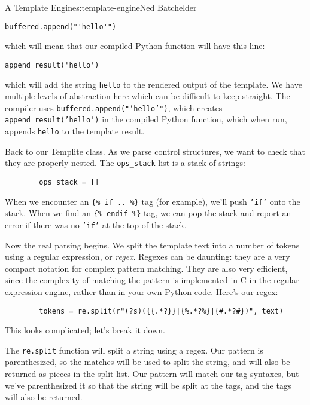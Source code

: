 \begin{aosachapter}{A Template Engine}{s:template-engine}{Ned Batchelder}
\begin{verbatim}
buffered.append("'hello'")
\end{verbatim}

which will mean that our compiled Python function will have this line:

\begin{verbatim}
append_result('hello')
\end{verbatim}

which will add the string \texttt{hello} to the rendered output of the
template. We have multiple levels of abstraction here which can be
difficult to keep straight. The compiler uses
\texttt{buffered.append("'hello'")}, which creates
\texttt{append\_result('hello')} in the compiled Python function, which
when run, appends \texttt{hello} to the template result.

Back to our Templite class. As we parse control structures, we want to
check that they are properly nested. The \texttt{ops\_stack} list is a
stack of strings:

\begin{verbatim}
        ops_stack = []
\end{verbatim}

When we encounter an \texttt{\{\% if .. \%\}} tag (for example), we'll
push \texttt{'if'} onto the stack. When we find an
\texttt{\{\% endif \%\}} tag, we can pop the stack and report an error
if there was no \texttt{'if'} at the top of the stack.

Now the real parsing begins. We split the template text into a number of
tokens using a regular expression, or \emph{regex}. Regexes can be
daunting: they are a very compact notation for complex pattern matching.
They are also very efficient, since the complexity of matching the
pattern is implemented in C in the regular expression engine, rather
than in your own Python code. Here's our regex:

\begin{verbatim}
        tokens = re.split(r"(?s)({{.*?}}|{%.*?%}|{#.*?#})", text)
\end{verbatim}

This looks complicated; let's break it down.

The \texttt{re.split} function will split a string using a regex. Our
pattern is parenthesized, so the matches will be used to split the
string, and will also be returned as pieces in the split list. Our
pattern will match our tag syntaxes, but we've parenthesized it so that
the string will be split at the tags, and the tags will also be
returned.


\end{aosachapter}
